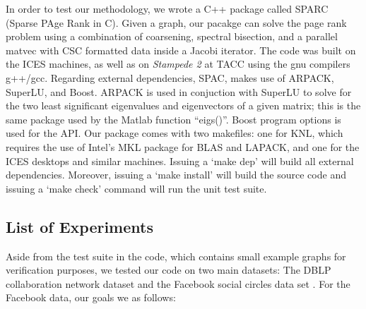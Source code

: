 \documentclass[11pt]{article}
\begin{document}
In order to test our methodology, we wrote a C++
package called {\rm SPARC} (Sparse PAge Rank in C). Given a
graph, our pacakge can solve the page rank problem using a combination of coarsening, spectral
bisection, and a parallel matvec with CSC formatted data inside a Jacobi
iterator. The code was built on the ICES machines, as well as on \textit{Stampede 2} at TACC using the gnu
compilers g++/gcc. Regarding external dependencies, {\rm SPAC}, makes use of
{\rm ARPACK}, {\rm SuperLU}, and {\rm Boost}. {\rm ARPACK} is used in conjuction
with {\rm SuperLU} to solve for the two least significant eigenvalues and
eigenvectors of a given
matrix; this is the same package used by the Matlab function ``eigs()''. {\rm
Boost} program options is used for the API. Our package comes with two
makefiles: one for KNL, which requires the use of Intel's MKL package for BLAS
and LAPACK, and one for the ICES desktops and similar machines. Issuing a `make
dep' will build all external dependencies. Moreover, issuing a `make install' will
build the source code and issuing a `make check' command will run the unit test suite.  

\subsection{List of Experiments}

Aside from the test suite in the code, which contains small example graphs
for verification purposes, we tested our code on two main datasets: The DBLP
collaboration network dataset and the Facebook social circles data set
\cite{snapnets,facebook,dblp}. For the Facebook data, our goals we as follows: 
\end{document}
